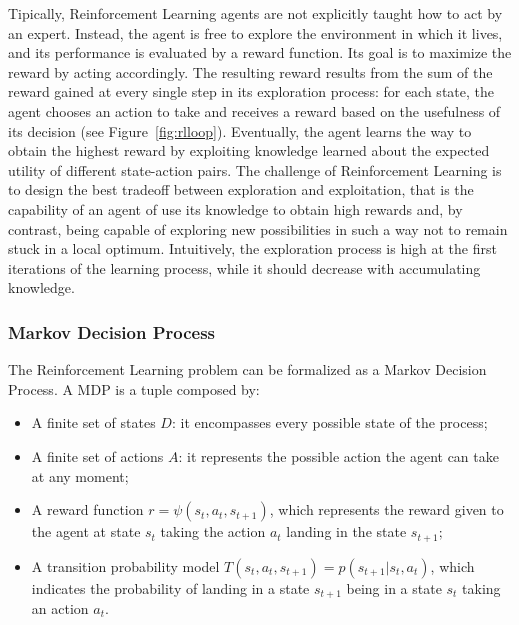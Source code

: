 Tipically, Reinforcement Learning agents are not explicitly taught how to act by an expert. Instead, the agent is free to explore the environment in which it lives, and its performance is evaluated by a reward function. Its goal is to maximize the reward by acting accordingly. The resulting reward results from the sum of the reward gained at every single step in its exploration process: for each state, the agent chooses an action to take and receives a reward based on the usefulness of its decision (see Figure~\ref{fig:rlloop}). Eventually, the agent learns the way to obtain the highest reward by exploiting knowledge learned about the expected utility of different state-action pairs. The challenge of Reinforcement Learning is to design the best tradeoff between exploration and exploitation, that is the capability of an agent of use its knowledge to obtain high rewards and, by contrast, being capable of exploring new possibilities in such a way not to remain stuck in a local optimum. Intuitively, the exploration process is high at the first iterations of the learning process, while it should decrease with accumulating knowledge.


\subsubsection{Markov Decision Process}
The Reinforcement Learning problem can be formalized as a Markov Decision Process. A MDP is a tuple composed by:
\begin{itemize}
  \item A finite set of states \(D\): it encompasses every possible state of the process;
  \item A finite set of actions \(A\): it represents the possible action the agent can take at any moment;
  	\item A reward function \(r = \psi(s_t,a_t,s_{t+1})\), which represents the reward given to the agent at state \(s_t\) taking the action \(a_t\) landing in the state \(s_{t+1};\)
  	\item A transition probability model \(T(s_t,a_t,s_{t+1}) = p(s_{t+1}|s_t,a_t)\), which indicates the probability of landing in a state \(s_{t+1}\) being in a state \(s_t\) taking an action \(a_t.\)
\end{itemize}

